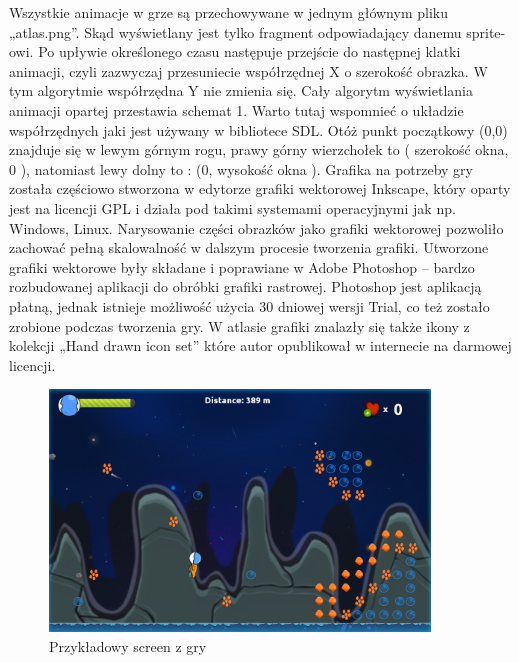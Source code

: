 Wszystkie animacje w grze są przechowywane w jednym głównym pliku „atlas.png”. Skąd wyświetlany jest tylko fragment odpowiadający danemu sprite-owi.
Po upływie określonego czasu następuje przejście do następnej klatki animacji, czyli zazwyczaj przesuniecie współrzędnej X o szerokość obrazka. W tym
algorytmie współrzędna Y nie zmienia się. Cały algorytm wyświetlania animacji opartej przestawia schemat 1.
Warto tutaj wspomnieć o układzie współrzędnych jaki jest używany w bibliotece SDL. Otóż punkt początkowy (0,0) znajduje się w lewym górnym
rogu, prawy górny wierzchołek to ( szerokość okna, 0 ), natomiast lewy dolny to : (0, wysokość okna ). Grafika na potrzeby gry została częściowo
stworzona w edytorze grafiki wektorowej Inkscape, który oparty jest na licencji GPL i działa pod takimi systemami operacyjnymi jak np. Windows, Linux.
Narysowanie części obrazków jako grafiki wektorowej pozwoliło zachować pełną skalowalność w dalszym procesie tworzenia grafiki. Utworzone grafiki
wektorowe były składane i poprawiane w Adobe Photoshop – bardzo rozbudowanej aplikacji do obróbki grafiki rastrowej. Photoshop jest aplikacją płatną,
jednak istnieje możliwość użycia 30 dniowej wersji Trial, co też zostało zrobione podczas tworzenia gry. W atlasie grafiki znalazły się także ikony z
kolekcji „Hand drawn icon set” które autor opublikował w internecie  na darmowej licencji.
\begin{figure}[h]
    \centering
    \includegraphics[width=0.9\textwidth,natwidth=525,natheight=142]{./Pictures/gra2.png}
    \caption{Przykładowy screen z gry}
\end{figure}

